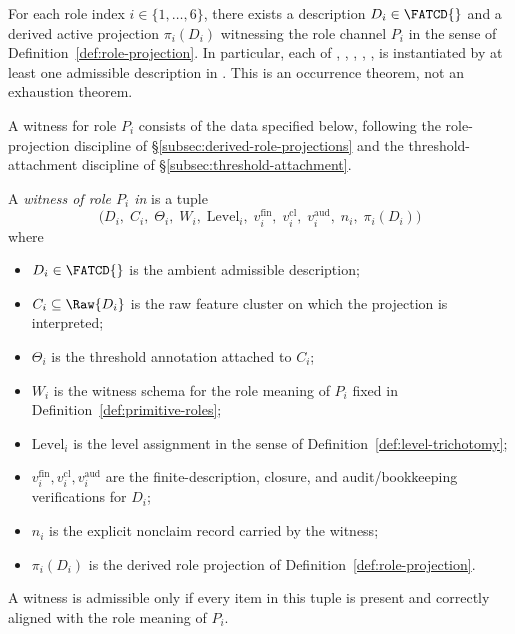 \begin{theorem}\label{thm:six-role-lower-bounds}
For each role index \(i \in \{1,\ldots,6\}\), there exists a description
\(D_i \in \FATCD{}\) and a derived active projection
\(\pi_i(D_i)\) witnessing the role channel \(P_i\) in the sense of
Definition~\ref{def:role-projection}. In particular, each of
\Pone{}, \Ptwo{}, \Pthree{}, \Pfour{}, \Pfive{}, \Psix{} is instantiated
by at least one admissible description in \FATCD{}. This is an occurrence
theorem, not an exhaustion theorem.
\end{theorem}

A witness for role \(P_i\) consists of the data specified below,
following the role-projection discipline of
\S\ref{subsec:derived-role-projections} and the threshold-attachment
discipline of \S\ref{subsec:threshold-attachment}.

\begin{definition}\label{def:common-witness-data}
A \emph{witness of role \(P_i\) in \FATCD{}} is a tuple
\[
\bigl(D_i,\; C_i,\; \Theta_i,\; W_i,\; \mathrm{Level}_i,\;
v_i^{\mathrm{fin}},\; v_i^{\mathrm{cl}},\; v_i^{\mathrm{aud}},\;
n_i,\; \pi_i(D_i)\bigr)
\]
where
\begin{itemize}[topsep=2pt,itemsep=1pt]
  \item \(D_i \in \FATCD{}\) is the ambient admissible description;
  \item \(C_i \subseteq \Raw{D_i}\) is the raw feature cluster on which
    the projection is interpreted;
  \item \(\Theta_i\) is the threshold annotation attached to \(C_i\);
  \item \(W_i\) is the witness schema for the role meaning of \(P_i\)
    fixed in Definition~\ref{def:primitive-roles};
  \item \(\mathrm{Level}_i\) is the level assignment in the sense of
    Definition~\ref{def:level-trichotomy};
  \item \(v_i^{\mathrm{fin}}, v_i^{\mathrm{cl}}, v_i^{\mathrm{aud}}\) are
    the finite-description, closure, and audit/bookkeeping verifications
    for \(D_i\);
  \item \(n_i\) is the explicit nonclaim record carried by the witness;
  \item \(\pi_i(D_i)\) is the derived role projection of
    Definition~\ref{def:role-projection}.
\end{itemize}
A witness is admissible only if every item in this tuple is present and
correctly aligned with the role meaning of \(P_i\).
\end{definition}

